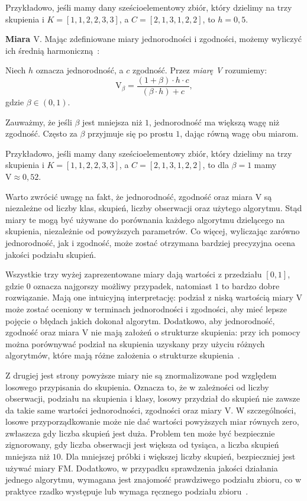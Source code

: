 \documentclass{praca1}
\begin{document}
Przykładowo, jeśli mamy dany sześcioelementowy zbiór, który dzielimy na trzy skupienia i $K = [1, 1, 2, 2, 3, 3]$, a $C = [2, 1, 3, 1, 2, 2]$, to $h = 0,5$.

\textbf{Miara $\textrm{V}$}. Mając zdefiniowane miary jednorodności i zgodności, możemy wyliczyć ich średnią harmoniczną~\cite{Rosenberg2007:vmeasure}:

\begin{definition}
Niech $h$ oznacza jednorodność, a $c$ zgodność. Przez \emph{miarę V} rozumiemy:
\begin{equation}
\textrm{V}_{\beta} = \frac{(1+\beta)\cdot h \cdot c}{(\beta \cdot h) + c},
\end{equation}
gdzie $\beta \in (0,1)$.
\end{definition}

Zauważmy, że jeśli $\beta$ jest mniejsza niż $1$, jednorodność ma większą wagę niż zgodność. Często za $\beta$ przyjmuje się po prostu $1$, dając równą wagę obu miarom.

Przykładowo, jeśli mamy dany sześcioelementowy zbiór, który dzielimy na trzy skupienia i $K = [1, 1, 2, 2, 3, 3]$, a $C = [2, 1, 3, 1, 2, 2]$, to dla $\beta = 1$ mamy $\textrm{V} \approx 0,52$.

Warto zwrócić uwagę na fakt, że jednorodność, zgodność oraz miara V są niezależne od liczby klas, skupień, liczby obserwacji oraz użytego algorytmu. Stąd miary te mogą być używane do porównania każdego algorytmu dzielącego na skupienia, niezależnie od powyższych parametrów. Co więcej, wyliczając zarówno jednorodność, jak i zgodność, może zostać otrzymana bardziej precyzyjna ocena jakości podziału skupień.


Wszystkie trzy wyżej zaprezentowane miary dają wartości z przedziału $[0, 1]$, gdzie $0$ oznacza najgorszy możliwy przypadek, natomiast $1$ to bardzo dobre rozwiązanie. Mają one intuicyjną interpretację: podział z niską wartością miary V może zostać oceniony w terminach jednorodności i zgodności, aby mieć lepsze pojęcie o błędach jakich dokonał algorytm. Dodatkowo, aby jednorodność, zgodność oraz miara V nie mają założeń o strukturze skupienia: przy ich pomocy można porównywać podział na skupienia uzyskany przy użyciu różnych algorytmów, które mają różne założenia o strukturze skupienia~\cite{scikit}. 

Z drugiej jest strony powyższe miary nie są znormalizowane pod względem losowego przypisania do skupienia. Oznacza to, że w zależności od liczby obserwacji, podziału na skupienia i klasy, losowy przydział do skupień nie zawsze da takie same wartości jednorodności, zgodności oraz miary V. W szczególności, losowe przyporządkowanie może nie dać wartości powyższych miar równych zero, zwłaszcza gdy liczba skupień jest duża. Problem ten może być bezpiecznie zignorowany, gdy liczba obserwacji jest większa od tysiąca, a liczba skupień mniejsza niż $10$. Dla mniejszej próbki i większej liczby skupień, bezpieczniej jest używać miary FM.
Dodatkowo, w przypadku sprawdzenia jakości działania jednego algorytmu, wymagana jest znajomość prawdziwego podziału zbioru, co w praktyce rzadko występuje lub wymaga ręcznego podziału zbioru~\cite{scikit}.
\end{document}
